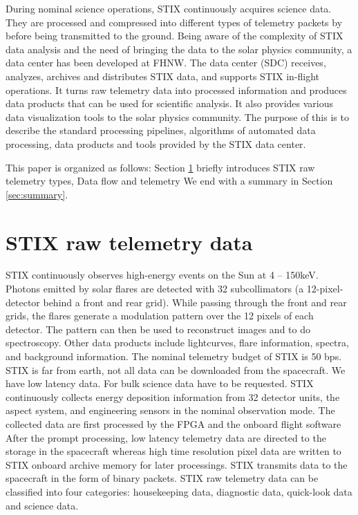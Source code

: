 \documentclass[referee]{aa} %
\begin{document}
During nominal science operations, STIX continuously acquires science data. 
They are processed and compressed into different types of telemetry packets by
before being transmitted to the ground.
Being aware of the complexity of STIX data analysis and 
the need of bringing the data to the solar physics community, a data center has been
developed at FHNW. The data center (SDC) receives, analyzes, archives and distributes STIX data,
 and supports STIX in-flight operations.
It turns raw telemetry data into processed information and produces data products that can be used for scientific analysis.
It also provides various data visualization tools to the solar physics community.
The purpose of this is to describe the standard processing pipelines, 
algorithms of automated data processing, data products and tools provided by the STIX data center.

This paper is organized as follows: Section \ref{sec:raw-data} briefly introduces STIX raw telemetry types, Data flow and telemetry
We end with a summary in Section \ref{sec:summary}.
\section{STIX raw telemetry data}
\label{sec:raw-data}

STIX continuously observes high-energy events on the Sun at 4 -- 150keV. 
Photons emitted by solar flares are detected with 32 subcollimators 
(a 12-pixel-detector behind a front and rear grid). While passing through the front and rear grids, 
the flares generate a modulation pattern over the 12 pixels of each detector. 
The pattern can then be used to reconstruct images and to do spectroscopy. 
Other data products include lightcurves, flare information, spectra, and background information.
The nominal telemetry budget of STIX is 50 bps.
STIX is far from earth, not all data can be downloaded from the spacecraft. We have low latency data.
For bulk science data have to be requested.
STIX continuously collects energy deposition information from 32 detector units, the aspect system,
and engineering sensors in the nominal observation mode.
The collected data are first processed by the FPGA and the onboard flight software
After the prompt processing, low latency telemetry data are directed to the
storage in the spacecraft whereas high time resolution pixel data are written to STIX onboard archive memory for
later processings.
STIX transmits data to the spacecraft in the form of binary packets.
STIX raw telemetry data can be classified into four
categories: housekeeping data, diagnostic data, quick-look data and science data.
\end{document}
